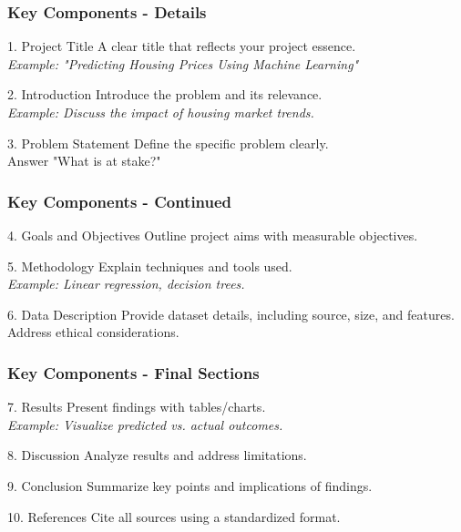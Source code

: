 \documentclass[aspectratio=169]{beamer}
\begin{document}
\begin{frame}[fragile]
    \frametitle{Key Components - Details}
    \begin{block}{1. Project Title}
        A clear title that reflects your project essence. \\
        \textit{Example: "Predicting Housing Prices Using Machine Learning"}
    \end{block}

    \begin{block}{2. Introduction}
        Introduce the problem and its relevance. \\
        \textit{Example: Discuss the impact of housing market trends.}
    \end{block}

    \begin{block}{3. Problem Statement}
        Define the specific problem clearly. \\
        Answer "What is at stake?" 
    \end{block}
\end{frame}

\begin{frame}[fragile]
    \frametitle{Key Components - Continued}
    \begin{block}{4. Goals and Objectives}
        Outline project aims with measurable objectives.
    \end{block}

    \begin{block}{5. Methodology}
        Explain techniques and tools used. \\
        \textit{Example: Linear regression, decision trees.}
    \end{block}

    \begin{block}{6. Data Description}
        Provide dataset details, including source, size, and features. \\ 
        Address ethical considerations.
    \end{block}
\end{frame}

\begin{frame}[fragile]
    \frametitle{Key Components - Final Sections}
    \begin{block}{7. Results}
        Present findings with tables/charts. \\
        \textit{Example: Visualize predicted vs. actual outcomes.}
    \end{block}

    \begin{block}{8. Discussion}
        Analyze results and address limitations.
    \end{block}

    \begin{block}{9. Conclusion}
        Summarize key points and implications of findings.
    \end{block}

    \begin{block}{10. References}
        Cite all sources using a standardized format.
    \end{block}
\end{frame}
\end{document}

